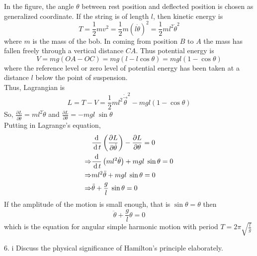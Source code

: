 \documentclass[12pt]{article}
\begin{document}
\begin{soln}
    In the figure, the angle \(\theta\) between rest position and deflected position is chosen as generalized coordinate. If the string is of length \(l\), then kinetic energy is
    \[
        T=\frac{1}{2}mv^2=\frac{1}{2}m \left( l\dot{\theta} \right)^2=\frac{1}{2}m l^2\dot{\theta}^2
    \]
    where \(m\) is the mass of the bob. In coming from position \(B\) to \(A\) the mass has fallen freely through a vertical distance \(CA\). Thus potential energy is
    \[
        V=mg(OA-OC)=mg(l-l\cos \theta)=mgl(1-\cos \theta)
    \]
    where the reference level or zero level of potential energy has been taken at a distance \(l\) below the point of suspension.\\
    Thus, Lagrangian is 
    \[L=T-V=\frac{1}{2}ml^2\dot{{\vec{\theta}}}^2-mgl(1-\cos \theta)\]
    So, \(\displaystyle\frac{\partial L}{\partial \dot{\theta}}=ml^2\dot{\theta}\) and \(\displaystyle \frac{\partial L}{\partial \theta}=-mgl\;\sin\theta\)\\
    Putting in Lagrange's equation,
    \begin{align*}
        &\frac{\,\mathrm{d}\,}{\,\mathrm{d}\, t}\left( \frac{\partial L}{\partial \dot{\theta}} \right)-\frac{\partial L}{\partial \theta }=0\\
        \Rightarrow &\frac{\,\mathrm{d}\,}{\,\mathrm{d}\, t}\left( ml^2\dot{\theta} \right)+mgl\;\sin\theta=0\\
        \Rightarrow & ml^2\ddot{\theta}+mgl\;\sin\theta=0\\
        \Rightarrow & \ddot{\theta}+\frac{g}{l}\;\sin\theta=0
    \end{align*}
    If the amplitude of the motion is small enough, that is \(\sin \theta=\theta\) then\[\ddot{\theta}+\frac{g}{l}\theta=0\]
    which is the equation for angular simple harmonic motion with period \(T=2\pi\sqrt{\frac{l}{g}}\)
\end{soln}
\begin{prob}{6. i}
    Discuss the physical significance of Hamilton's principle elaborately.
\end{prob}
\end{document}

